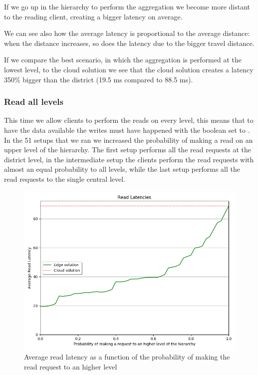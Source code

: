 If we go up in the hierarchy to perform the aggregation we become more distant to the reading client, creating a bigger latency on average.

We can see also how the average latency is proportional to the average distance: when the distance increases, so does the latency due to the bigger travel distance.

If we compare the best scenario, in which the aggregation is performed at the lowest level, to the cloud solution we see that the cloud solution creates a latency 350\% bigger than the district (19.5 ms compared to 88.5 ms). 


\subsubsection{Read all levels}
This time we allow clients to perform the reads on every level, this means that to have the data available the writes must have happened with the  boolean set to .
In the 51 setups that we ran we increased the probability of making a read on an upper level of the hierarchy. The first setup performs all the read requests at the district level, in the intermediate setup the clients perform the read requests with almost an equal probability to all levels, while the last setup performs all the read requests to the single central level.

\begin{figure}[H]
    \centering
    \includegraphics[width=0.86\linewidth]{Figures/Evaluation/read-all-latency.png}
    \caption{Average read latency as a function of the probability of making the read request to an higher level}
    \label{fig:/read-all-latency}
\end{figure}

